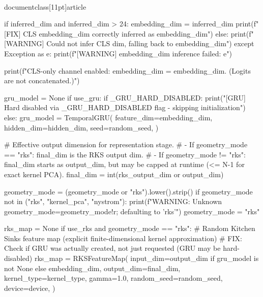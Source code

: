 \\documentclass[11pt]{article}
\begin{document}
\begin{CodeBlock}
            if inferred_dim and inferred_dim > 24:
                embedding_dim = inferred_dim
                print(f"[FIX] CLS embedding_dim correctly inferred as {embedding_dim}")
            else:
                print(f"[WARNING] Could not infer CLS dim, falling back to {embedding_dim}")
        except Exception as e:
            print(f"[WARNING] embedding_dim inference failed: {e}")

        print(f"CLS-only channel enabled: embedding_dim = {embedding_dim}. (Logits are not concatenated.)")


    gru_model = None
    if use_gru:
        if _GRU_HARD_DISABLED:
            print("[GRU] Hard disabled via _GRU_HARD_DISABLED flag - skipping initialization")
        else:
            gru_model = TemporalGRU(
                feature_dim=embedding_dim,
                hidden_dim=hidden_dim,
                seed=random_seed,
            )

    # Effective output dimension for representation stage.
    # - If geometry_mode == "rks": final_dim is the RKS output dim.
    # - If geometry_mode != "rks": final_dim starts as output_dim, but may be capped at runtime (<= N-1 for exact kernel PCA).
    final_dim = int(rks_output_dim or output_dim)

    geometry_mode = (geometry_mode or "rks").lower().strip()
    if geometry_mode not in ("rks", "kernel_pca", "nystrom"):
        print(f"WARNING: Unknown geometry_mode={geometry_mode!r}; defaulting to 'rks'")
        geometry_mode = "rks"

    rks_map = None
    if use_rks and geometry_mode == "rks":
        # Random Kitchen Sinks feature map (explicit finite-dimensional kernel approximation)
        # FIX: Check if GRU was actually created, not just requested (GRU may be hard-disabled)
        rks_map = RKSFeatureMap(
            input_dim=output_dim if gru_model is not None else embedding_dim,
            output_dim=final_dim,
            kernel_type=kernel_type,
            gamma=1.0,
            random_seed=random_seed,
            device=device,
        )


\end{CodeBlock}
\end{document}
